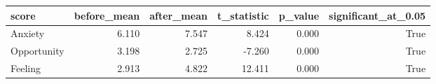 \begin{tabular}{lrrrrr}
\toprule
score & before\_mean & after\_mean & t\_statistic & p\_value & significant\_at\_0.05 \\
\midrule
Anxiety & 6.110 & 7.547 & 8.424 & 0.000 & True \\
Opportunity & 3.198 & 2.725 & -7.260 & 0.000 & True \\
Feeling & 2.913 & 4.822 & 12.411 & 0.000 & True \\
\bottomrule
\end{tabular}
